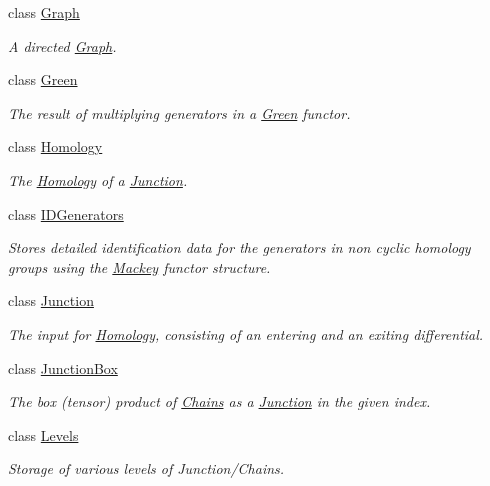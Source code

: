 \begin{DoxyCompactItemize}
class \hyperlink{classMackey_1_1Graph}{Graph}
\begin{DoxyCompactList}\small\item\em A directed \hyperlink{classMackey_1_1Graph}{Graph}. \end{DoxyCompactList}\item 
class \hyperlink{classMackey_1_1Green}{Green}
\begin{DoxyCompactList}\small\item\em The result of multiplying generators in a \hyperlink{classMackey_1_1Green}{Green} functor. \end{DoxyCompactList}\item 
class \hyperlink{classMackey_1_1Homology}{Homology}
\begin{DoxyCompactList}\small\item\em The \hyperlink{classMackey_1_1Homology}{Homology} of a \hyperlink{classMackey_1_1Junction}{Junction}. \end{DoxyCompactList}\item 
class \hyperlink{classMackey_1_1IDGenerators}{I\+D\+Generators}
\begin{DoxyCompactList}\small\item\em Stores detailed identification data for the generators in non cyclic homology groups using the \hyperlink{namespaceMackey}{Mackey} functor structure. \end{DoxyCompactList}\item 
class \hyperlink{classMackey_1_1Junction}{Junction}
\begin{DoxyCompactList}\small\item\em The input for \hyperlink{classMackey_1_1Homology}{Homology}, consisting of an entering and an exiting differential. \end{DoxyCompactList}\item 
class \hyperlink{classMackey_1_1JunctionBox}{Junction\+Box}
\begin{DoxyCompactList}\small\item\em The box (tensor) product of \hyperlink{classMackey_1_1Chains}{Chains} as a \hyperlink{classMackey_1_1Junction}{Junction} in the given index. \end{DoxyCompactList}\item 
class \hyperlink{classMackey_1_1Levels}{Levels}
\begin{DoxyCompactList}\small\item\em Storage of various levels of Junction/\+Chains. \end{DoxyCompactList}\item 

\end{DoxyCompactItemize}
